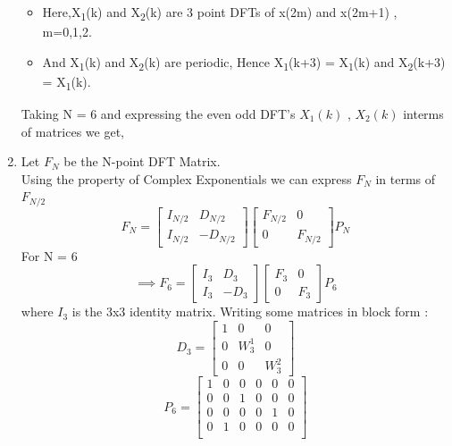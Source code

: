 \documentclass[journal,12pt,twocolumn]{IEEEtran}
\renewcommand\thesection{\arabic{section}}
\begin{document}
\begin{enumerate}[label=\thesection.\arabic*.,ref=\thesection.\theenumi]
\begin{itemize}
	\item Here,X\textsubscript{1}(k) and X\textsubscript{2}(k) are 3 point DFTs of x(2m) and x(2m+1) , m=0,1,2.
	\item And X\textsubscript{1}(k) and X\textsubscript{2}(k) are periodic, Hence X\textsubscript{1}(k+3) = X\textsubscript{1}(k) and X\textsubscript{2}(k+3) = X\textsubscript{1}(k).
\end{itemize}
Taking N = 6 and expressing the even odd DFT's $X_{1}(k)$ , $X_{2}(k)$ interms of matrices we get,

\item
Let $F_{N}$ be the N-point DFT Matrix. \\
Using the property of Complex Exponentials we can express $F_{N}$ in terms of $F_{N/2}$
\begin{equation}
F_{N}=
\begin{bmatrix}
I_{N/2} & D_{N/2} \\
I_{N/2} & -D_{N/2}
\end{bmatrix}
\begin{bmatrix}
F_{N/2} & 0 \\
0 & F_{N/2}
\end{bmatrix}
P_{N}
\end{equation}
For N = 6
\begin{equation}
\implies F_{6}=
\begin{bmatrix}
I_{3} & D_{3} \\
I_{3} & -D_{3}
\end{bmatrix}
\begin{bmatrix}
F_{3} & 0 \\
0 & F_{3}
\end{bmatrix}
P_{6}
\end{equation}
where
$I_{3}$ is the 3x3 identity matrix. Writing some matrices in block form :
\begin{equation}
D_{3}=
\begin{bmatrix}
1 & 0 & 0 \\
0 & W^{1}_{3} & 0 \\
0 & 0 & W^{2}_{3}
\end{bmatrix}
\end{equation}
\begin{equation}
P_{6} =
\begin{bmatrix}
1 & 0 & 0 & 0 & 0 & 0\\
0 & 0 & 1 & 0 & 0 & 0\\
0 & 0 & 0 & 0 & 1 & 0\\
0 & 1 & 0 & 0 & 0 & 0\\

\end{bmatrix}
\end{equation}
\end{enumerate}
\end{document}
